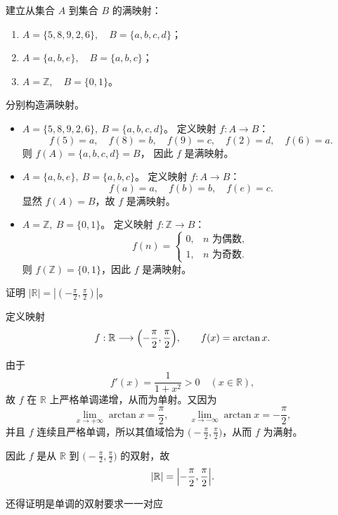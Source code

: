 \begin{homework}[1.2]
建立从集合 $A$ 到集合 $B$ 的满映射：
\begin{enumerate}
  \item $A = \{5,8,9,2,6\}, \quad B = \{a,b,c,d\}$；
  \item $A = \{a,b,e\}, \quad B = \{a,b,c\}$；
  \item $A = \mathbb{Z}, \quad B = \{0,1\}$。
\end{enumerate}
\end{homework}
\begin{solution}
分别构造满映射。

\begin{itemize}
  \item[(1)] $A=\{5,8,9,2,6\},\ B=\{a,b,c,d\}$。  
  定义映射 $f:A\to B$：
  \[
  f(5)=a,\quad f(8)=b,\quad f(9)=c,\quad f(2)=d,\quad f(6)=a.
  \]
  则
  \(
  f(A)=\{a,b,c,d\}=B
  \)，
  因此 $f$ 是满映射。

  \item[(2)] $A=\{a,b,e\},\ B=\{a,b,c\}$。  
  定义映射 $f:A\to B$：
  \[
  f(a)=a,\quad f(b)=b,\quad f(e)=c.
  \]
  显然 $f(A)=B$，故 $f$ 是满映射。

  \item[(3)] $A=\mathbb Z,\ B=\{0,1\}$。  
  定义映射 $f:\mathbb Z\to B$：
  \[
  f(n)=
  \begin{cases}
  0, & n \text{ 为偶数},\\
  1, & n \text{ 为奇数}.
  \end{cases}
  \]
  则 $f(\mathbb Z)=\{0,1\}$，因此 $f$ 是满映射。
\end{itemize}
\end{solution}
\begin{homework}[1.3]
证明 $|\mathbb{R}| = |(-\tfrac{\pi}{2}, \tfrac{\pi}{2})|$。
\end{homework}
\begin{solution}
定义映射
\[
f:\mathbb R\longrightarrow \Bigl(-\frac{\pi}{2},\frac{\pi}{2}\Bigr),\qquad f(x)=\arctan x.
\]

由于
\[
f'(x)=\frac{1}{1+x^2}>0\quad(x\in\mathbb R),
\]
故 $f$ 在 $\mathbb R$ 上严格单调递增，从而为单射。又因为
\[
\lim_{x\to+\infty}\arctan x=\frac{\pi}{2},\qquad
\lim_{x\to-\infty}\arctan x=-\frac{\pi}{2},
\]
并且 $f$ 连续且严格单调，所以其值域恰为
\(
\bigl(-\frac{\pi}{2},\frac{\pi}{2}\bigr)
\)，从而 $f$ 为满射。

因此 $f$ 是从 $\mathbb R$ 到 $\bigl(-\frac{\pi}{2},\frac{\pi}{2}\bigr)$ 的双射，故
\[
|\mathbb R|=\Bigl|-\frac{\pi}{2},\frac{\pi}{2}\Bigr|.
\]
\end{solution}
\begin{dxtips}
    还得证明是单调的双射要求一一对应
\end{dxtips}









